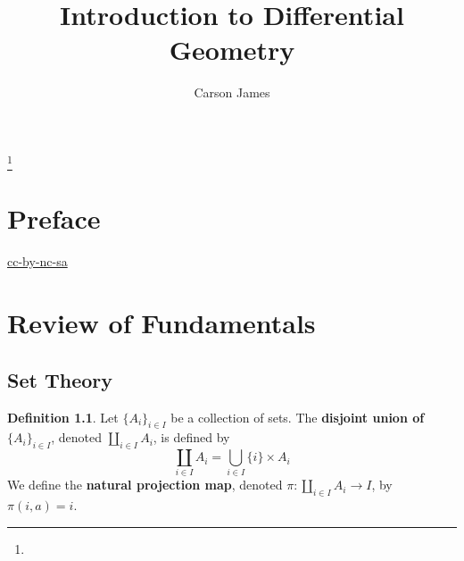 \documentclass{book}
\theoremstyle{definition}
\newtheorem{defn}[definition]{Definition}
\DeclareMathOperator*{\0}{\mbf{0}}
\DeclareMathOperator*{\1}{\mbf{1}}
\begin{document}
	
	\frontmatter
	
	\title{Introduction to Differential Geometry}
	
	
	\author{Carson James}
	\thanks{}
	
	\date{}
	
	\maketitle
	
	
\setcounter{page}{4}
	
\tableofcontents
\printunsrtglossary[type=symbols,style=long,title={Notation}]
	
%
	
\mainmatter
%
	
\chapter*{Preface}
	
\begin{flushleft}
	\href{https://creativecommons.org/licenses/by-nc-sa/4.0/legalcode.txt}{cc-by-nc-sa}
\end{flushleft}
	
\newpage
	
	\chapter{Review of Fundamentals}

	\section{Set Theory}
	
	\begin{defn}
		Let $\{A_i\}_{i \in I}$ be a collection of sets. The \textbf{disjoint union of} $\{A_i\}_{i \in I}$, denoted $\coprod\limits_{i \in I} A_i$, is defined by $$\coprod_{i \in I}A_i = \bigcup_{i\in I} \{i\} \times A_i$$ 
		We define the \textbf{natural projection map}, denoted $\pi: \coprod\limits_{i \in I} A_i \rightarrow I$, by $\pi(i, a) = i$.
	\end{defn}
\end{document}
